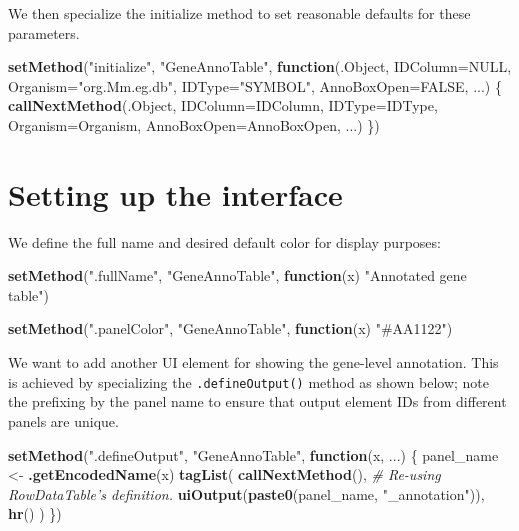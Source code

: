 \documentclass[]{book}
\newenvironment{Shaded}{\begin{snugshade}}{\end{snugshade}}
\newcommand{\KeywordTok}[1]{\textcolor[rgb]{0.13,0.29,0.53}{\textbf{#1}}}
\newcommand{\DataTypeTok}[1]{\textcolor[rgb]{0.13,0.29,0.53}{#1}}
\newcommand{\StringTok}[1]{\textcolor[rgb]{0.31,0.60,0.02}{#1}}
\newcommand{\CommentTok}[1]{\textcolor[rgb]{0.56,0.35,0.01}{\textit{#1}}}
\newcommand{\OtherTok}[1]{\textcolor[rgb]{0.56,0.35,0.01}{#1}}
\newcommand{\ControlFlowTok}[1]{\textcolor[rgb]{0.13,0.29,0.53}{\textbf{#1}}}
\newcommand{\NormalTok}[1]{#1}
\begin{document}
We then specialize the initialize method to set reasonable defaults for
these parameters.

\begin{Shaded}
\begin{Highlighting}[]
\KeywordTok{setMethod}\NormalTok{(}\StringTok{"initialize"}\NormalTok{, }\StringTok{"GeneAnnoTable"}\NormalTok{, }\ControlFlowTok{function}\NormalTok{(.Object, }\DataTypeTok{IDColumn=}\OtherTok{NULL}\NormalTok{, }
    \DataTypeTok{Organism=}\StringTok{"org.Mm.eg.db"}\NormalTok{, }\DataTypeTok{IDType=}\StringTok{"SYMBOL"}\NormalTok{, }\DataTypeTok{AnnoBoxOpen=}\OtherTok{FALSE}\NormalTok{, ...)}
\NormalTok{\{}
    \KeywordTok{callNextMethod}\NormalTok{(.Object, }\DataTypeTok{IDColumn=}\NormalTok{IDColumn, }\DataTypeTok{IDType=}\NormalTok{IDType,}
        \DataTypeTok{Organism=}\NormalTok{Organism, }\DataTypeTok{AnnoBoxOpen=}\NormalTok{AnnoBoxOpen, ...)}
\NormalTok{\})}
\end{Highlighting}
\end{Shaded}

\section{Setting up the interface}\label{setting-up-the-interface-2}

We define the full name and desired default color for display purposes:

\begin{Shaded}
\begin{Highlighting}[]
\KeywordTok{setMethod}\NormalTok{(}\StringTok{".fullName"}\NormalTok{, }\StringTok{"GeneAnnoTable"}\NormalTok{, }\ControlFlowTok{function}\NormalTok{(x) }\StringTok{"Annotated gene table"}\NormalTok{)}

\KeywordTok{setMethod}\NormalTok{(}\StringTok{".panelColor"}\NormalTok{, }\StringTok{"GeneAnnoTable"}\NormalTok{, }\ControlFlowTok{function}\NormalTok{(x) }\StringTok{"#AA1122"}\NormalTok{)}
\end{Highlighting}
\end{Shaded}

We want to add another UI element for showing the gene-level annotation.
This is achieved by specializing the \texttt{.defineOutput()} method as
shown below; note the prefixing by the panel name to ensure that output
element IDs from different panels are unique.

\begin{Shaded}
\begin{Highlighting}[]
\KeywordTok{setMethod}\NormalTok{(}\StringTok{".defineOutput"}\NormalTok{, }\StringTok{"GeneAnnoTable"}\NormalTok{, }\ControlFlowTok{function}\NormalTok{(x, ...) \{}
\NormalTok{    panel_name <-}\StringTok{ }\KeywordTok{.getEncodedName}\NormalTok{(x)}
    \KeywordTok{tagList}\NormalTok{(}
        \KeywordTok{callNextMethod}\NormalTok{(), }\CommentTok{# Re-using RowDataTable's definition.}
        \KeywordTok{uiOutput}\NormalTok{(}\KeywordTok{paste0}\NormalTok{(panel_name, }\StringTok{"_annotation"}\NormalTok{)),}
        \KeywordTok{hr}\NormalTok{()}
\NormalTok{    )}
\NormalTok{\})}
\end{Highlighting}
\end{Shaded}
\end{document}
